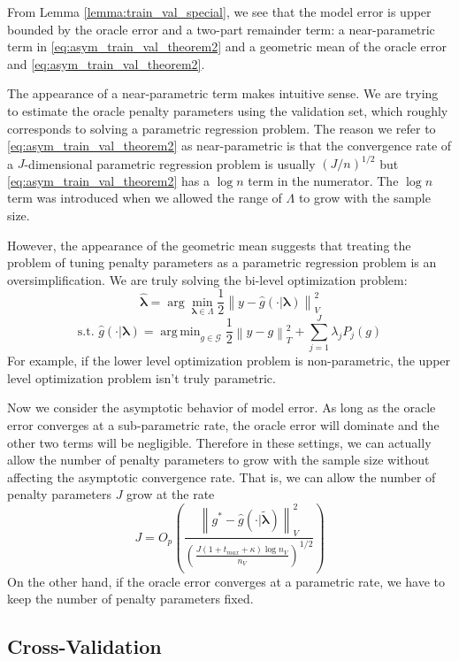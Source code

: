 \documentclass[12pt]{article}
\DeclareMathOperator*{\argmin}{arg\,min}
\begin{document}
From Lemma \ref{lemma:train_val_special}, we see that the model error is upper bounded by the oracle error and a two-part remainder term: a near-parametric term in \ref{eq:asym_train_val_theorem2} and a geometric mean of the oracle error and \ref{eq:asym_train_val_theorem2}.

The appearance of a near-parametric term makes intuitive sense. We are trying to estimate the oracle penalty parameters using the validation set, which roughly corresponds to solving a parametric regression problem. The reason we refer to \ref{eq:asym_train_val_theorem2} as near-parametric is that the convergence rate of a $J$-dimensional parametric regression problem is usually $(J/n)^{1/2}$ but \ref{eq:asym_train_val_theorem2} has a $\log n$ term in the numerator. The $\log n$ term was introduced when we allowed the range of $\Lambda$ to grow with the sample size.

However, the appearance of the geometric mean suggests that treating the problem of tuning penalty parameters as a parametric regression problem is an oversimplification. We are truly solving the bi-level optimization problem:
$$
\hat{\boldsymbol \lambda} = \arg\min_{\boldsymbol{\lambda} \in\Lambda} \frac{1}{2} \left \| y-\hat{g}(\cdot | \boldsymbol \lambda) \right \|_{V}^{2}
$$
$$
\text{s.t. } \hat{g}(\cdot | \boldsymbol \lambda) = \argmin_{g\in \mathcal{G}} \frac{1}{2} \left \|y -  g \right \|_T^2 + \sum_{j=1}^J \lambda_j P_j(g)
$$
For example, if the lower level optimization problem is non-parametric, the upper level optimization problem isn't truly parametric.

Now we consider the asymptotic behavior of model error. As long as the oracle error converges at a sub-parametric rate, the oracle error will dominate and the other two terms will be negligible. Therefore in these settings, we can actually allow the number of penalty parameters to grow with the sample size without affecting the asymptotic convergence rate. That is, we can allow the number of penalty parameters $J$ grow at the rate
\begin{equation}
J = O_p\left (
\frac{\left \| g^*-\hat{g}(\cdot | \tilde{\boldsymbol {\lambda}}) \right \|_{V}^{2}}
{\left(\frac{J\left(1+t_{max}+\kappa\right)\log n_{V}}{n_{V}}\right)^{1/2}}
\right)
\end{equation}
On the other hand, if the oracle error converges at a parametric rate, we have to keep the number of penalty parameters fixed.

\subsection{Cross-Validation}
\end{document}
